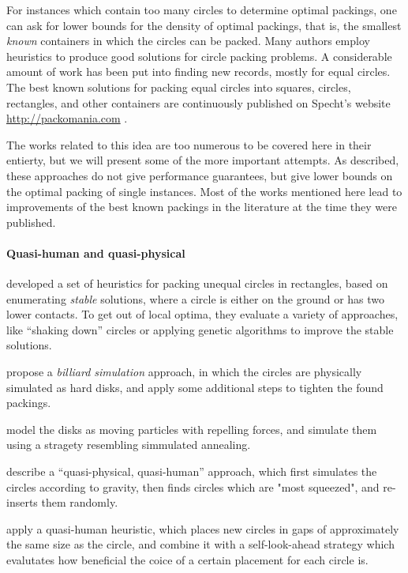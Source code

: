 \documentclass[a4paper,style=print,oneside,bibliography=totoc,nexus,lnum,extramargin]{tubsbook}
\begin{document}
For instances which contain too many circles to determine optimal packings, one can ask for lower bounds for the density of optimal packings, that is, the smallest \emph{known} containers in which the circles can be packed.
Many authors employ heuristics to produce good solutions for circle packing problems.
A considerable amount of work has been put into finding new records, mostly for equal circles. The best known solutions for packing equal circles into squares, circles, rectangles, and other containers are continuously published on Specht's website \url{http://packomania.com} \cite{specht2015packomania}.

The works related to this idea are too numerous to be covered here in their entierty, but we will present some of the more important attempts. As described, these approaches do not give performance guarantees, but give lower bounds on the optimal packing of single instances. Most of the works mentioned here lead to improvements of the best known packings in the literature at the time they were published.

\paragraph{Quasi-human and quasi-physical}

\textcite{GGL1995packing} developed a set of heuristics for packing unequal circles in rectangles, based on enumerating \emph{stable} solutions, where a circle is either on the ground or has two lower contacts. To get out of local optima, they evaluate a variety of approaches, like “shaking down” circles or applying genetic algorithms to improve the stable solutions.

\textcite{GLNO1998dense} propose a \emph{billiard simulation} approach, in which the circles are physically simulated as hard disks, and apply some additional steps to tighten the found packings.

\textcite{BDGL2000improving} model the disks as moving particles with repelling forces, and simulate them using a stragety resembling simmulated annealing.

\textcite{WHZX2002improved} describe a “quasi-physical, quasi-human” approach, which first simulates the circles according to gravity, then finds circles which are "most squeezed", and re-inserts them randomly.

\textcite{HLLX2006new} apply a quasi-human heuristic, which places new circles in gaps of approximately the same size as the circle, and combine it with a self-look-ahead strategy which evalutates how beneficial the coice of a certain placement for each circle is.
\end{document}
